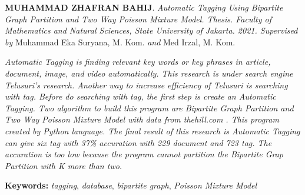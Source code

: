 \documentclass{jtetiskripsi}
\begin{document}
\begin{abstracteng}

\textbf {MUHAMMAD ZHAFRAN BAHIJ}. \emph{Automatic Tagging Using Bipartite Graph Partition and Two Way Poisson Mixture Model. Thesis. Faculty of Mathematics and Natural Sciences, State University of Jakarta. 2021. Supervised by} Muhammad Eka Suryana, M. Kom. \emph{and} Med Irzal, M. Kom. 
\vskip1cm

\textit{Automatic Tagging is finding relevant key words or key phrases in article, document, image, and video automatically.
This research is under search engine Telusuri's research. Another way to increase efficiency of Telusuri is searching with tag.
Before do searching with tag, the first step is create an Automatic Tagging. 
Two algorithm to build this program are Bipartite Graph Partition and Two Way Poisson Mixture Model with data from thehill.com . This program created by Python language.
The final result of this research is Automatic Tagging can give six tag with 37\% accuration with 229 document and 723 tag. The accuration is too low because
the program cannot partition the Bipartite Grap Partition with K more than two.
}

\bigskip
\noindent
\textbf {Keywords:} \textit{tagging}, \textit{database}, \textit{bipartite graph}, \textit{Poisson Mixture Model}
\end{abstracteng}


\tableofcontents 
{}
\listoffigures
{}

\begin{counterpage}
\end{counterpage}






\end{document}
